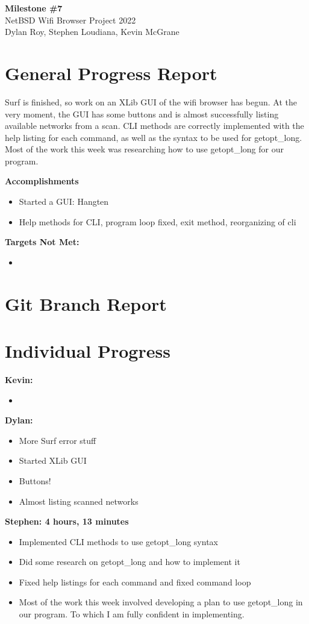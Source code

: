 \documentclass[11pt]{article}
\begin{document}
\begin{center}
  \textbf{\Large Milestone \#7}\\\large NetBSD Wifi Browser Project 2022\\
  Dylan Roy, Stephen Loudiana, Kevin McGrane
\end{center}

\section{General Progress Report}
Surf is finished, so work on an XLib GUI of the wifi browser has begun.
At the very moment, the GUI has some buttons and is almost successfully
listing available networks from a scan. CLI methods are correctly implemented 
with the help listing for each command, as well as the syntax to be used for 
getopt_long. Most of the work this week was researching how to use getopt_long 
for our program. 

\textbf{Accomplishments}
\begin{itemize}
  \item Started a GUI: Hangten
  \item Help methods for CLI, program loop fixed, exit method, reorganizing of cli
\end{itemize}

\textbf{Targets Not Met:}
\begin{itemize}
  \item 
\end{itemize}


\section{Git Branch Report}

\newpage
\section{Individual Progress}

\textbf{Kevin:}
\begin{itemize}
  \item 
\end{itemize}

\textbf{Dylan:}
\begin{itemize}
  \item More Surf error stuff
  \item Started XLib GUI
  \item Buttons!
  \item Almost listing scanned networks
\end{itemize}

\textbf{Stephen: 4 hours, 13 minutes}
\begin{itemize}
  \item Implemented CLI methods to use getopt_long syntax
  \item Did some research on getopt_long and how to implement it
  \item Fixed help listings for each command and fixed command loop 
  \item Most of the work this week involved developing a plan to use 
	getopt_long in our program. To which I am fully confident in 
	implementing. 
\end{itemize}
\end{document}
